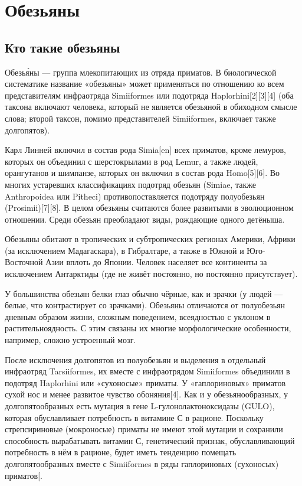 \documentclass[a4paper, 12pt]{report}
\begin{document}
	\chapter{Обезьяны}
	\section{Кто такие обезьяны}
	
Обезья́ны — группа млекопитающих из отряда приматов. В биологической систематике название «обезьяны» может применяться по отношению ко всем представителям инфраотряда Simiiformes или подотряда Haplorhini[2][3][4] (оба таксона включают человека, который не является обезьяной в обиходном смысле слова; второй таксон, помимо представителей Simiiformes, включает также долгопятов).

Карл Линней включил в состав рода Simia[en] всех приматов, кроме лемуров, которых он объединил с шерстокрылами в род Lemur, а также людей, орангутанов и шимпанзе, которых он включил в состав рода Homo[5][6]. Во многих устаревших классификациях подотряд обезьян (Simiae, также Anthropoidea или Pitheci) противопоставляется подотряду полуобезьян (Prosimii)[7][8]. В целом обезьяны считаются более развитыми в эволюционном отношении. Среди обезьян преобладают виды, рождающие одного детёныша.

Обезьяны обитают в тропических и субтропических регионах Америки, Африки (за исключением Мадагаскара), в Гибралтаре, а также в Южной и Юго-Восточной Азии вплоть до Японии. Человек населяет все континенты за исключением Антарктиды (где не живёт постоянно, но постоянно присутствует).

У большинства обезьян белки глаз обычно чёрные, как и зрачки (у людей — белые, что контрастирует со зрачками). Обезьяны отличаются от полуобезьян дневным образом жизни, сложным поведением, всеядностью с уклоном в растительноядность. С этим связаны их многие морфологические особенности, например, сложно устроенный мозг.

После исключения долгопятов из полуобезьян и выделения в отдельный инфраотряд Tarsiiformes, их вместе с инфраотрядом Simiiformes объединили в подотряд Haplorhini или «сухоносые» приматы. У «гаплориновых» приматов сухой нос и менее развитое чувство обоняния[4]. Как и у обезьянообразных, у долгопятообразных есть мутация в гене L-гулонолактоноксидазы (GULO), которая обуславливает потребность в витамине С в рационе. Поскольку стрепсириновые (мокроносые) приматы не имеют этой мутации и сохранили способность вырабатывать витамин С, генетический признак, обуславливающий потребность в нём в рационе, будет иметь тенденцию помещать долгопятообразных вместе с Simiiformes в ряды гаплориновых (сухоносых) приматов[.
	
\end{document}
